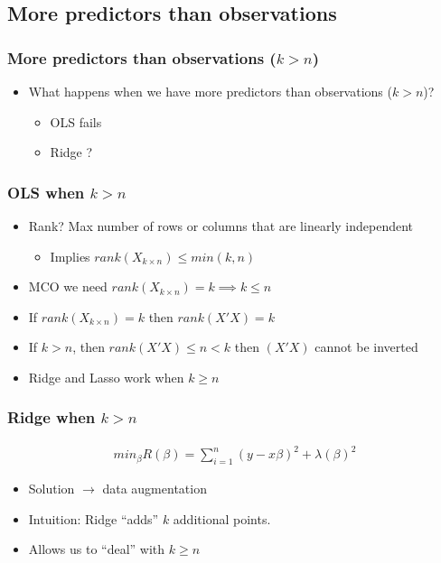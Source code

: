 \documentclass[
  shownotes,
  xcolor={svgnames},
  hyperref={colorlinks,citecolor=DarkBlue,linkcolor=andesred,urlcolor=DarkBlue}
  , aspectratio=169]{beamer}
\begin{document}
\subsection{More predictors than observations }
\begin{frame}[fragile]
\frametitle{More predictors than observations ($k>n$)}

\begin{itemize}
  \item What happens when we have more predictors than observations ($k>n$)?
  \bigskip
  \begin{itemize}
   \item OLS fails
   \medskip
   \item Ridge ?
  \end{itemize}

\end{itemize}

\end{frame}


\begin{frame}[fragile]
\frametitle{OLS when $k>n$}

\begin{itemize}
  \item Rank? Max number of rows or columns that are linearly independent
  \begin{itemize}
  \item Implies $rank(X_{k\times n}) \leq min(k,n)$
  \end{itemize}
  \bigskip
  \item MCO we need $rank(X_{k\times n})=k \implies k\leq n$
  \bigskip
  \item If $rank(X_{k\times n})=k$ then $rank(X'X)=k$
  \bigskip
  \item If $k>n$, then  $rank(X'X)\leq n < k$ then $(X'X)$ cannot be inverted
  \bigskip
  \item Ridge and Lasso work when $k \geq n$
\end{itemize}

\end{frame}

\begin{frame}[fragile]
\frametitle{Ridge when $k>n$}

\begin{align}
min_{\beta} R(\beta) = \sum_{i=1}^n (y-x\beta)^2 + \lambda  (\beta)^2
\end{align}

\bigskip
\begin{itemize}
  \item Solution $\rightarrow$ data augmentation
  \medskip
  \item Intuition: Ridge ``adds'' $k$ additional points.
  \medskip
  \item Allows us to ``deal'' with $k\geq n$
\end{itemize}
\end{frame}
\end{document}

